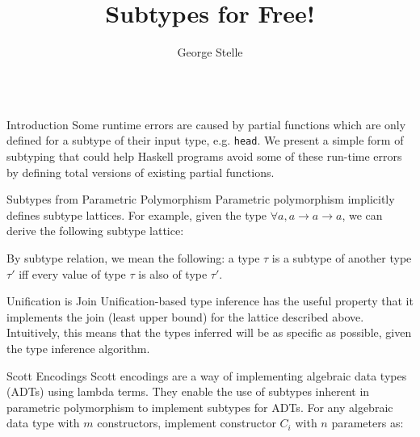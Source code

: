 \documentclass[final]{beamer}
\title{Subtypes for Free!}
\author{George Stelle}
\institute{University of New Mexico}
\begin{document}
\begin{frame}[fragile]
\begin{columns}[t]
\begin{column}{.285\textwidth}

\begin{block}{Introduction}
\vspace{0.5cm}
Some runtime errors are caused by partial functions which are only defined for a
subtype of their input type, e.g. \texttt{head}. We present a simple form of
subtyping that could help Haskell programs avoid some of these run-time errors
by defining total versions of existing partial functions. 
\end{block}
\vspace{1cm}
\begin{block}{Subtypes from Parametric Polymorphism}
\vspace{0.5cm}
Parametric polymorphism implicitly defines subtype lattices. For example, given
the type $\forall a, a \rightarrow a \rightarrow a$, we can derive the following
subtype lattice:
\vspace{0.5cm}
\begin{figure}[!h]
\centering
{}
\end{figure}
By subtype relation, we mean the following: a type $\tau$ is a subtype of
another type $\tau'$ iff every value of type $\tau$ is also of type $\tau'$.
\end{block}
\vspace{1cm}
\begin{block}{Unification is Join}
\vspace{0.5cm}
Unification-based type inference has the useful property that it implements the
join (least upper bound) for the lattice described above. Intuitively, this
means that the types inferred will be as specific as possible, given the type
inference algorithm. 
\end{block}
\vspace{1cm}
\begin{block}{Scott Encodings}
\vspace{0.5cm}
Scott encodings are a way of implementing algebraic data types (ADTs) using
lambda terms. They enable the use of subtypes inherent in parametric
polymorphism to implement subtypes for ADTs. For any algebraic data type with
$m$ constructors, implement constructor $C_i$ with $n$ parameters as:


\end{block}
\end{column}
\end{columns}
\end{frame}
\end{document}
